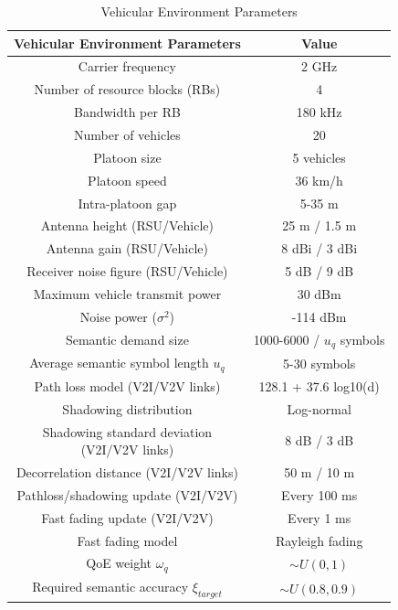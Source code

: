 \documentclass[10pt, lettersize,journal]{IEEEtran}
\begin{document}
	\begin{table}[t]
		\setlength{\tabcolsep}{-0.2pt}
		\begin{center}
			\caption{Vehicular Environment Parameters}
			\begin{tabular}{|c|c|}
				\hline
				\textbf{Vehicular Environment Parameters} & \textbf{Value} \\ \hline
				Carrier frequency & 2 GHz \\ \hline
				Number of resource blocks (RBs) & 4 \\ \hline
				Bandwidth per RB & 180 kHz \\ \hline
				Number of vehicles & 20 \\ \hline
				Platoon size & 5 vehicles \\ \hline
				Platoon speed & 36 km/h \\ \hline
				Intra-platoon gap & 5-35 m \\ \hline
				Antenna height (RSU/Vehicle) & 25 m / 1.5 m \\ \hline
				Antenna gain (RSU/Vehicle) & 8 dBi / 3 dBi \\ \hline
				Receiver noise figure (RSU/Vehicle) & 5 dB / 9 dB \\ \hline
				Maximum vehicle transmit power & 30 dBm \\ \hline
				Noise power (\( \sigma^2 \)) & -114 dBm \\ \hline
				Semantic demand size & 1000-6000 / \( u_q \) symbols \\ \hline
				Average semantic symbol length \( u_q \) & 5-30 symbols \\ \hline
				Path loss model (V2I/V2V links) & 128.1 + 37.6 log10(d) \\ \hline
				Shadowing distribution & Log-normal \\ \hline
				\makecell{Shadowing standard deviation \\(V2I/V2V links)}  & 8 dB / 3 dB \\ \hline
				Decorrelation distance (V2I/V2V links) & 50 m / 10 m \\ \hline
				Pathloss/shadowing update (V2I/V2V) & Every 100 ms \\ \hline
				Fast fading update (V2I/V2V) & Every 1 ms \\ \hline
				Fast fading model & Rayleigh fading \\ \hline
				QoE weight \( \omega_q \) & \( \sim U(0, 1) \) \\ \hline
				Required semantic accuracy \( {\xi _{target}} \) & \( \sim U(0.8, 0.9) \) \\ \hline

\end{tabular}
\end{center}
\end{table}
\end{document}
